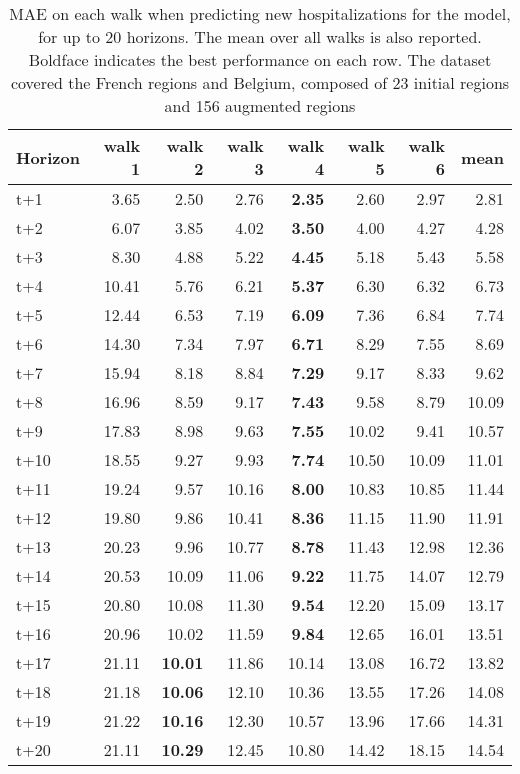 \begin{table}[H]
\centering
\caption{MAE on each walk when predicting new hospitalizations for the model, for up to 20 horizons. The mean over all walks is also reported. Boldface indicates the best performance on each row. The dataset covered the French regions and Belgium, composed of 23 initial regions and 156 augmented regions }
\label{tab:MAE_walk_baseline}
\begin{tabular}{lrrrrrrr}
\toprule
Horizon &  walk 1 &  walk 2 &  walk 3 &  walk 4 &  walk 5 &  walk 6 &  mean \\
\midrule
t+1  & 3.65  & 2.50  & 2.76  & \textbf{2.35}  & 2.60  & 2.97  & 2.81  \\
t+2  & 6.07  & 3.85  & 4.02  & \textbf{3.50}  & 4.00  & 4.27  & 4.28  \\
t+3  & 8.30  & 4.88  & 5.22  & \textbf{4.45}  & 5.18  & 5.43  & 5.58  \\
t+4  & 10.41  & 5.76  & 6.21  & \textbf{5.37}  & 6.30  & 6.32  & 6.73  \\
t+5  & 12.44  & 6.53  & 7.19  & \textbf{6.09}  & 7.36  & 6.84  & 7.74  \\
t+6  & 14.30  & 7.34  & 7.97  & \textbf{6.71}  & 8.29  & 7.55  & 8.69  \\
t+7  & 15.94  & 8.18  & 8.84  & \textbf{7.29}  & 9.17  & 8.33  & 9.62  \\
t+8  & 16.96  & 8.59  & 9.17  & \textbf{7.43}  & 9.58  & 8.79  & 10.09  \\
t+9  & 17.83  & 8.98  & 9.63  & \textbf{7.55}  & 10.02  & 9.41  & 10.57  \\
t+10  & 18.55  & 9.27  & 9.93  & \textbf{7.74}  & 10.50  & 10.09  & 11.01  \\
t+11  & 19.24  & 9.57  & 10.16  & \textbf{8.00}  & 10.83  & 10.85  & 11.44  \\
t+12  & 19.80  & 9.86  & 10.41  & \textbf{8.36}  & 11.15  & 11.90  & 11.91  \\
t+13  & 20.23  & 9.96  & 10.77  & \textbf{8.78}  & 11.43  & 12.98  & 12.36  \\
t+14  & 20.53  & 10.09  & 11.06  & \textbf{9.22}  & 11.75  & 14.07  & 12.79  \\
t+15  & 20.80  & 10.08  & 11.30  & \textbf{9.54}  & 12.20  & 15.09  & 13.17  \\
t+16  & 20.96  & 10.02  & 11.59  & \textbf{9.84}  & 12.65  & 16.01  & 13.51  \\
t+17  & 21.11  & \textbf{10.01}  & 11.86  & 10.14  & 13.08  & 16.72  & 13.82  \\
t+18  & 21.18  & \textbf{10.06}  & 12.10  & 10.36  & 13.55  & 17.26  & 14.08  \\
t+19  & 21.22  & \textbf{10.16}  & 12.30  & 10.57  & 13.96  & 17.66  & 14.31  \\
t+20  & 21.11  & \textbf{10.29}  & 12.45  & 10.80  & 14.42  & 18.15  & 14.54  \\

\bottomrule
\end{tabular}
\end{table}

